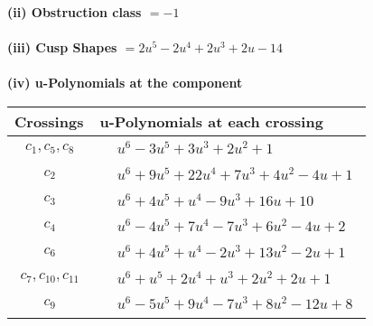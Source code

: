 \documentclass[1p]{elsarticle_modified}
\theoremstyle{definition}
\begin{document}
\flushleft \textbf{(ii) Obstruction class $= -1$}\\~\\
\flushleft \textbf{(iii) Cusp Shapes $= 2 u^5-2 u^4+2 u^3+2 u-14$}\\~\\
\newpage\renewcommand{\arraystretch}{1}
\flushleft \textbf{(iv) u-Polynomials at the component}\newline \\
\begin{tabular}{m{50pt}|m{274pt}}
Crossings & \hspace{64pt}u-Polynomials at each crossing \\
\hline $$\begin{aligned}c_{1},c_{5},c_{8}\end{aligned}$$&$\begin{aligned}
&u^6-3 u^5+3 u^3+2 u^2+1
\end{aligned}$\\
\hline $$\begin{aligned}c_{2}\end{aligned}$$&$\begin{aligned}
&u^6+9 u^5+22 u^4+7 u^3+4 u^2-4 u+1
\end{aligned}$\\
\hline $$\begin{aligned}c_{3}\end{aligned}$$&$\begin{aligned}
&u^6+4 u^5+u^4-9 u^3+16 u+10
\end{aligned}$\\
\hline $$\begin{aligned}c_{4}\end{aligned}$$&$\begin{aligned}
&u^6-4 u^5+7 u^4-7 u^3+6 u^2-4 u+2
\end{aligned}$\\
\hline $$\begin{aligned}c_{6}\end{aligned}$$&$\begin{aligned}
&u^6+4 u^5+u^4-2 u^3+13 u^2-2 u+1
\end{aligned}$\\
\hline $$\begin{aligned}c_{7},c_{10},c_{11}\end{aligned}$$&$\begin{aligned}
&u^6+u^5+2 u^4+u^3+2 u^2+2 u+1
\end{aligned}$\\
\hline $$\begin{aligned}c_{9}\end{aligned}$$&$\begin{aligned}
&u^6-5 u^5+9 u^4-7 u^3+8 u^2-12 u+8
\end{aligned}$\\
\hline
\end{tabular}\\~\\
\end{document}
